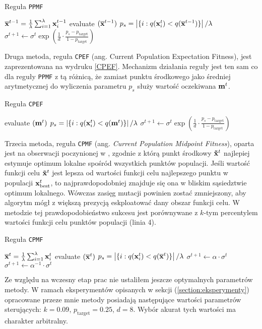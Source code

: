 \begin{algorithm}[h]
    \caption{Reguła \texttt{PPMF}}
\begin{algorithmic}[1]
   \State $\overline{{\bf x}}^{t-1}=\frac{1}{\lambda}\sum_{i=1}^\lambda {\bf x}_i^{t-1}$
   \State evaluate $(\overline{{\bf x}}^{t-1})$
   \State $p_s = \left|\{i: q({\bf x}_i^t) < q(\overline{{\bf x}}^{t-1})\}\right|/\lambda$
   \State $\sigma^{t+1} \gets \sigma^t \exp\left(\frac{1}{d} \cdot \frac{p_s-p_\text{target}}{1-p_\text{target}}\right) $
\end{algorithmic}
\end{algorithm}

    Druga metoda, reguła \texttt{CPEF} (ang. Current Population Expectation Fitness), jest zaprezentowana na wydruku \ref{CPEF}. Mechanizm działania reguły jest ten sam co dla reguły \texttt{PPMF} z tą różnicą, że zamiast punktu środkowego jako średniej arytmetycznej do wyliczenia parametru $p_s$ służy wartość oczekiwana ${\bf m}^t$.
    
\begin{algorithm}[h]
\caption{ Reguła \texttt{CPEF}}
\begin{algorithmic}[1]
   \State evaluate $({\bf m}^t)$
   \State $p_s = \left|\{i: q({\bf x}_i^t) < q({\bf m}^t)\}\right|/\lambda$
   \State $\sigma^{t+1} \gets \sigma^t \exp\left(\frac{1}{d} \cdot \frac{p_s-p_\text{target}}{1-p_\text{target}}\right)  $
\end{algorithmic}
\end{algorithm}

 
  Trzecia metoda, reguła \texttt{CPMF} (ang. \textit{Current Population Midpoint Fitness}), oparta jest na obserwacji poczynionej w \cite{Arabas17}, zgodnie z którą punkt środkowy ${\bf \tilde x}^{t}$ najlepiej estymuje optimum lokalne
  spośród wszystkich punktów populacji.
  Jeśli wartość funkcji celu ${\bf \tilde x}^{t}$ jest lepsza od wartości funkcji celu najlepszego punktu w populacji ${\bf x}^{t}_{\text{best}}$, to najprawdopodobniej znajduje się ona w bliskim sąsiedztwie optimum lokalnego. Wówczas zasięg mutacji powinien zostać zmniejszony, aby algorytm mógł z większą prezycją eskploatować dany obszar funkcji celu. W metodzie tej prawdopodobieństwo sukcesu jest porównywane z $k$-tym percentylem wartości funkcji celu punktów populacji (linia 4).
 \begin{algorithm}[h]
    \caption{Reguła \texttt{CPMF}}
\begin{algorithmic}[1]
   \State $\overline{{\bf x}}^t=\frac{1}{\lambda}\sum_{i=1}^\lambda {\bf x}_i^t$
   \State evaluate $(\overline{{\bf x}}^t)$
   \State $p_s = \left|\{i: q({\bf x}_i^t) < q(\overline{{\bf x}}^t)\}\right|/\lambda$
   \State $\sigma^{t+1} \gets \alpha \cdot \sigma^t $
   \Else 
   \State $\sigma^{t+1} \gets \alpha^{-1} \cdot \sigma^t $
   \EndIf
\end{algorithmic}
\end{algorithm}

Ze względu na wczesny etap prac nie ustaliłem jeszcze optymalnych parametrów metody. W ramach eksperymentów opisanych w sekcji (\ref{section:eksperymenty}) opracowane przeze mnie metody
posiadają następujące wartości parametrów sterujących: $k = 0.09$, $p_{\text{target}} = 0.25$, $d = 8$. Wybór akurat tych wartości ma charakter arbitralny.
